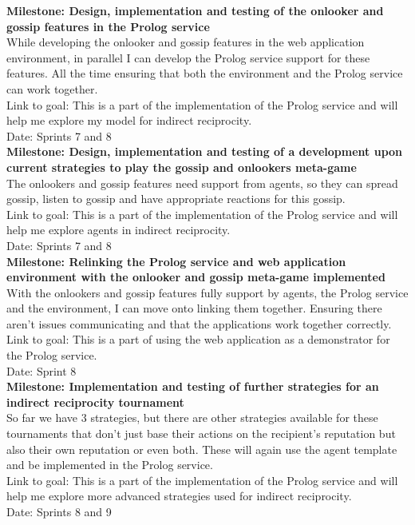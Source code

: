 \documentclass{article}
\begin{document}
\noindent\textbf{Milestone: Design, implementation and testing of the onlooker and gossip features in the Prolog service}\\
While developing the onlooker and gossip features in the web application environment, in parallel I can develop the Prolog service support for these features. All the time ensuring that both the environment and the Prolog service can work together.\\
Link to goal: This is a part of the implementation of the Prolog service and will help me explore my model for indirect reciprocity.\\
Date: Sprints 7 and 8\\

\noindent\textbf{Milestone: Design, implementation and testing of a development upon current strategies to play the gossip and onlookers meta-game}\\
The onlookers and gossip features need support from agents, so they can spread gossip, listen to gossip and have appropriate reactions for this gossip.\\
Link to goal: This is a part of the implementation of the Prolog service and will help me explore agents in indirect reciprocity.\\
Date: Sprints 7 and 8\\

\noindent\textbf{Milestone: Relinking the Prolog service and web application environment with the onlooker and gossip meta-game implemented}\\
With the onlookers and gossip features fully support by agents, the Prolog service and the environment, I can move onto linking them together. Ensuring there aren't issues communicating and that the applications work together correctly.\\
Link to goal: This is a part of using the web application as a demonstrator for the Prolog service.\\
Date: Sprint 8\\

\noindent\textbf{Milestone: Implementation and testing of further strategies for an indirect reciprocity tournament}\\
So far we have 3 strategies, but there are other strategies available for these tournaments that don't just base their actions on the recipient's reputation but also their own reputation or even both. These will again use the agent template and be implemented in the Prolog service.\\
Link to goal: This is a part of the implementation of the Prolog service and will help me explore more advanced strategies used for indirect reciprocity.\\
Date: Sprints 8 and 9\\
\end{document}
